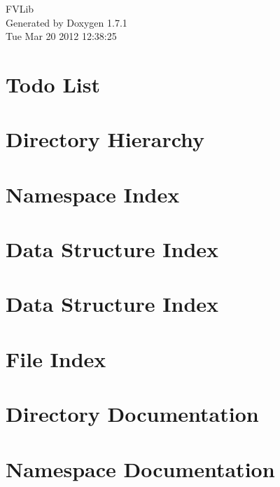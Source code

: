 \documentclass[a4paper]{book}
\begin{document}
\hypersetup{pageanchor=false}
\begin{titlepage}
\vspace*{7cm}
\begin{center}
{\Large FVLib }\\
\vspace*{1cm}
{\large Generated by Doxygen 1.7.1}\\
\vspace*{0.5cm}
{\small Tue Mar 20 2012 12:38:25}\\
\end{center}
\end{titlepage}
\clearemptydoublepage
{}
\tableofcontents
\clearemptydoublepage
{}
\hypersetup{pageanchor=true}
\chapter{Todo List}
\label{todo}
\hypertarget{todo}{}

\chapter{Directory Hierarchy}

\chapter{Namespace Index}

\chapter{Data Structure Index}

\chapter{Data Structure Index}

\chapter{File Index}

\chapter{Directory Documentation}



\chapter{Namespace Documentation}

\end{document}
